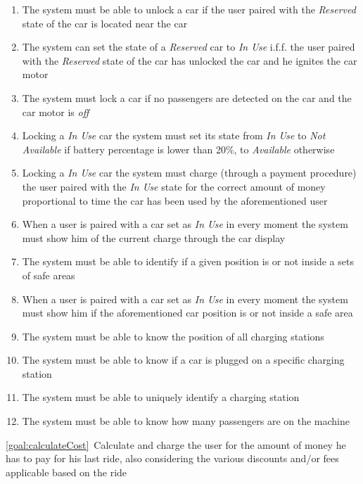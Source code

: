 \begin{description}
\begin{enumerate}[resume*]
  				\item The system must be able to unlock a car if the user paired with the
  				\emph{Reserved} state of the car is located near  the car
  				\item The system can set the state of a \emph{Reserved} car to \emph{In Use} i.f.f. the
  				user paired with the \emph{Reserved} state of the car has unlocked the car and he ignites
  				the car motor
  				\item The system must lock a car if no passengers are detected on the car and the car
  				motor is \emph{off}
  				\item Locking a \emph{In Use} car the system must set its state from \emph{In Use} to
  				\emph{Not Available} if battery percentage is lower than 20\%, to \emph{Available}
  				otherwise
  				\item Locking a \emph{In Use} car the system must charge (through a payment
  				procedure) the user paired with the \emph{In Use} state for the correct amount of money
  				proportional to time the car has been used by the aforementioned user
  				\item When a user is paired with a car set as \emph{In Use} in every moment the system
  				must show him of the current charge through the car display 
  				\item The system must be able to identify if a given position is or not inside a sets of safe
  				areas
  				\item When a user is paired with a car set as \emph{In Use} in every moment the system
  				must show him if the aforementioned car position is or not inside a safe area
  				\item The system must be able to know the position of all charging stations
  				\item The system must be able to know if a car is plugged on a specific charging station
  				\item The system must be able to uniquely identify a charging station
  				\item The system must be able to know how many passengers are on the machine	
   			\end{enumerate}
  		\item \ref{goal:calculateCost}\ Calculate and charge the user for the amount of money he has
  		to pay for his last ride, also considering the various discounts and/or fees applicable based on
  		the ride
  			\begin{enumerate}[resume*]

\end{enumerate}
\end{description}
